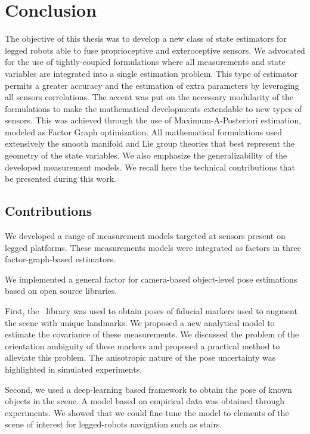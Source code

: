 \chapter{Conclusion}

The objective of this thesis was to develop a new class of state estimators for legged robots able to fuse proprioceptive and exteroceptive
sensors. We advocated for the use of tightly-coupled formulations where all measurements and state variables are integrated into a single estimation 
problem. This type of estimator permits a greater accuracy and the estimation of extra parameters by leveraging all sensors correlations.
The accent was put on the necessary modularity of the formulations to make the mathematical developments extendable to new types of sensors. This 
was achieved through the use of Maximum-A-Posteriori estimation, modeled as Factor Graph optimization. All mathematical formulations used extensively the smooth manifold
and Lie group theories that best represent the geometry of the state variables. We also emphasize the generalizability of the developed measurement models. 
We recall here the technical contributions that be presented during this work.

\section{Contributions}

We developed a range of measurement models targeted at sensors present on legged platforms. These measurements models were integrated as factors in 
three factor-graph-based estimators.

\bigskip

We implemented a general factor for camera-based object-level pose estimations based on open source libraries. 

First, the \apriltag\ library was used 
to obtain poses of fiducial markers used to augment the scene with unique landmarks. We proposed a new analytical model to estimate the covariance of 
these measurements. We discussed the problem of the orientation ambiguity of these markers and proposed a practical method to alleviate this problem.
The anisotropic nature of the pose uncertainty was highlighted in simulated experiments. 

Second, we used a deep-learning based framework to obtain the pose of known objects in the scene. A model based on empirical data was obtained through
experiments. We showed that we could fine-tune the model to elements of the scene of interest for legged-robots navigation such as stairs.

